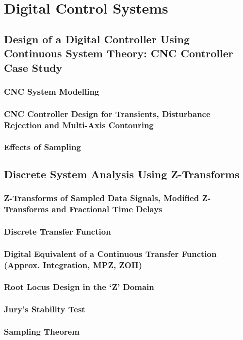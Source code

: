 \chapter{Digital Control Systems}

\section{Design of a Digital Controller Using Continuous System Theory: CNC Controller Case Study}
\subsection*{CNC System Modelling}
\subsection*{CNC Controller Design for Transients, Disturbance Rejection and Multi-Axis Contouring}
\subsection*{Effects of Sampling}

\section{Discrete System Analysis Using Z-Transforms}
\subsection*{Z-Transforms of Sampled Data Signals, Modified Z-Transforms and Fractional Time Delays}
\subsection*{Discrete Transfer Function}
\subsection*{Digital Equivalent of a Continuous Transfer Function (Approx. Integration, MPZ, ZOH)}
\subsection*{Root Locus Design in the ‘Z’ Domain}
\subsection*{Jury’s Stability Test}
\subsection*{Sampling Theorem}

